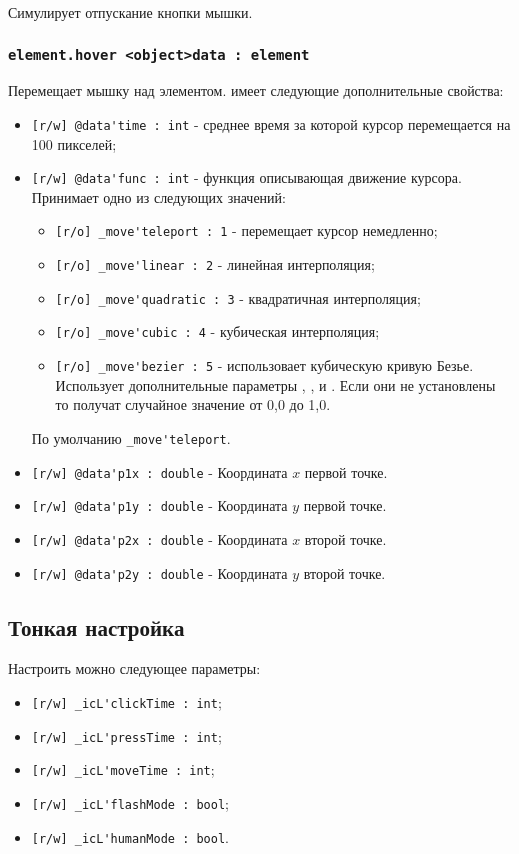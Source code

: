 \documentclass[a4paper, 14pt]{extarticle}
\newenvironment{icItems}
	{ \begin{itemize} [noitemsep,nolistsep] }
	{ \end{itemize} }
\begin{document}
Симулирует отпускание кнопки мышки.

\subsubsection{\lstinline|element.hover <object>data : element|}

Перемещает мышку над элементом.  имеет следующие дополнительные свойства:
\begin{icItems}
	\item \lstinline|[r/w] @data'time : int| - среднее время за которой курсор перемещается на 100 пикселей;
	\item \lstinline|[r/w] @data'func : int| - функция описывающая движение курсора. Принимает одно из следующих значений:
	\begin{icItems}
		\item \lstinline|[r/o] _move'teleport : 1| - перемещает курсор немедленно;
		\item \lstinline|[r/o] _move'linear : 2| - линейная интерполяция;
		\item \lstinline|[r/o] _move'quadratic : 3| - квадратичная интерполяция;
		\item \lstinline|[r/o] _move'cubic : 4| - кубическая интерполяция;
		\item \lstinline|[r/o] _move'bezier : 5| - использовает кубическую кривую Безье. Использует дополнительные параметры , ,  и . Если они не установлены то получат случайное значение от 0,0 до 1,0.
	\end{icItems}
	По умолчанию \lstinline|_move'teleport|.
	\item \lstinline|[r/w] @data'p1x : double| - Координата $x$ первой точке.
	\item \lstinline|[r/w] @data'p1y : double| - Координата $y$ первой точке.
	\item \lstinline|[r/w] @data'p2x : double| - Координата $x$ второй точке.
	\item \lstinline|[r/w] @data'p2y : double| - Координата $y$ второй точке.
\end{icItems}

\subsection{Тонкая настройка}

Настроить можно следующее параметры:
\begin{icItems}
	\item \lstinline|[r/w] _icL'clickTime : int|;
	\item \lstinline|[r/w] _icL'pressTime : int|;
	\item \lstinline|[r/w] _icL'moveTime : int|;
	\item \lstinline|[r/w] _icL'flashMode : bool|;
	\item \lstinline|[r/w] _icL'humanMode : bool|.
\end{icItems}
\end{document}
